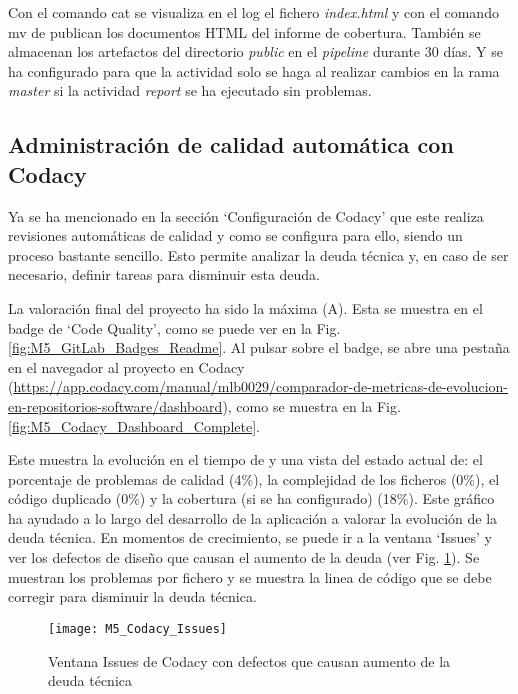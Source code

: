Con el comando cat se visualiza en el log el fichero \textit{index.html} y con el comando mv de publican los documentos HTML del informe de cobertura. También se almacenan los artefactos del directorio \textit{public} en el \textit{pipeline} durante 30 días. Y se ha configurado para que la actividad solo se haga al realizar cambios en la rama \textit{master} si la actividad \textit{report} se ha ejecutado sin problemas.

\subsection{Administración de calidad automática con Codacy}

Ya se ha mencionado en la sección `Configuración de Codacy' que este realiza revisiones automáticas de calidad y como se configura para ello, siendo un proceso bastante sencillo. Esto permite analizar la deuda técnica y, en caso de ser necesario, definir tareas para disminuir esta deuda. 

La valoración final del proyecto ha sido la máxima (A). Esta se muestra en el badge de `Code Quality', como se puede ver en la Fig. \ref{fig:M5_GitLab_Badges_Readme}. Al pulsar sobre el badge, se abre una pestaña en el navegador al proyecto en Codacy (\url{https://app.codacy.com/manual/mlb0029/comparador-de-metricas-de-evolucion-en-repositorios-software/dashboard}), como se muestra en la Fig. \ref{fig:M5_Codacy_Dashboard_Complete}.


Este muestra la evolución en el tiempo de y una vista del estado actual de: el porcentaje de problemas de calidad (4\%), la complejidad de los ficheros (0\%), el código duplicado (0\%) y la cobertura (si se ha configurado) (18\%). Este gráfico ha ayudado a lo largo del desarrollo de la aplicación a valorar la evolución de la deuda técnica. En momentos de crecimiento, se puede ir a la ventana `Issues'  y ver los defectos de diseño que causan el aumento de la deuda (ver Fig. \ref{fig:M5_Codacy_Issues}). Se muestran los problemas por fichero y se muestra la linea de código que se debe corregir para disminuir la deuda técnica.

\begin{figure}[!h]
	\centering
	\texttt{[image: M5\_Codacy\_Issues]}
	\caption{Ventana Issues de Codacy con defectos que causan aumento de la deuda técnica}\label{fig:M5_Codacy_Issues}
\end{figure}
\FloatBarrier

